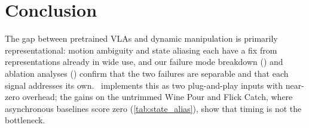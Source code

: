 


\section{Conclusion}
\label{sec:conclusion}

The gap between pretrained VLAs and dynamic manipulation is primarily representational: motion ambiguity and state aliasing each have a fix from representations already in wide use, and our failure mode breakdown () and ablation analyses () confirm that the two failures are separable and that each signal addresses its own. \ours\ implements this as two plug-and-play inputs with near-zero overhead; the gains on the untrimmed Wine Pour and Flick Catch, where asynchronous baselines score zero (\cref{tab:state_alias}), show that timing is not the bottleneck.


